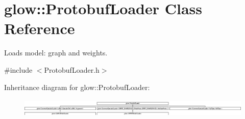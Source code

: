 \hypertarget{classglow_1_1_protobuf_loader}{}\section{glow\+:\+:Protobuf\+Loader Class Reference}
\label{classglow_1_1_protobuf_loader}


Loads model\+: graph and weights.  




{\ttfamily \#include $<$Protobuf\+Loader.\+h$>$}

Inheritance diagram for glow\+:\+:Protobuf\+Loader\+:\begin{figure}[H]
\begin{center}
\leavevmode
\includegraphics[height=0.904685cm]{classglow_1_1_protobuf_loader}
\end{center}
\end{figure}
